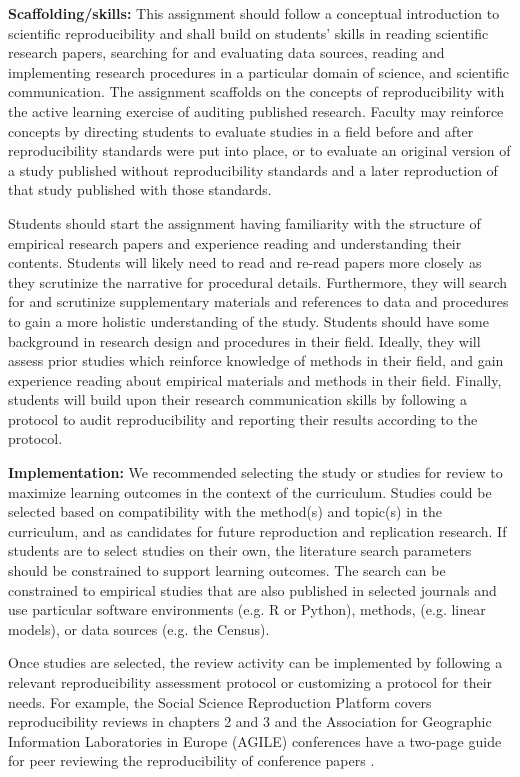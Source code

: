 \documentclass[
  12pt]{article}
\begin{document}
\textbf{Scaffolding/skills:} This assignment should follow a conceptual introduction to scientific reproducibility and shall build on students' skills in reading scientific research papers, searching for and evaluating data sources, reading and implementing research procedures in a particular domain of science, and scientific communication.
The assignment scaffolds on the concepts of reproducibility with the active learning exercise of auditing published research.
Faculty may reinforce concepts by directing students to evaluate studies in a field before and after reproducibility standards were put into place, or to evaluate an original version of a study published without reproducibility standards and a later reproduction of that study published with those standards. 

Students should start the assignment having familiarity with the structure of empirical research papers and experience reading and understanding their contents.
Students will likely need to read and re-read papers more closely as they scrutinize the narrative for procedural details.
Furthermore, they will search for and scrutinize supplementary materials and references to data and procedures to gain a more holistic understanding of the study. 
Students should have some background in research design and procedures in their field.
Ideally, they will assess prior studies which reinforce knowledge of methods in their field, and gain experience reading about empirical materials and methods in their field.
Finally, students will build upon their research communication skills by following a protocol to audit reproducibility and reporting their results according to the protocol.

\textbf{Implementation:} We recommended selecting the study or studies for review to maximize learning outcomes in the context of the curriculum.
Studies could be selected based on compatibility with the method(s) and topic(s) in the curriculum, and as candidates for future reproduction and replication research.
If students are to select studies on their own, the literature search parameters should be constrained to support learning outcomes.
The search can be constrained to empirical studies that are also published in selected journals and use particular software environments (e.g. R or Python), methods, (e.g. linear models), or data sources (e.g. the Census). 

Once studies are selected, the review activity can be implemented by following a relevant reproducibility assessment protocol or customizing a protocol for their needs.
For example, the Social Science Reproduction Platform covers reproducibility reviews in chapters 2 and 3 \citep{BITSS2020} and the Association for Geographic Information Laboratories in Europe (AGILE) conferences have a two-page guide for peer reviewing the reproducibility of conference papers \citep{nustAGILEguidelines}.
\end{document}

